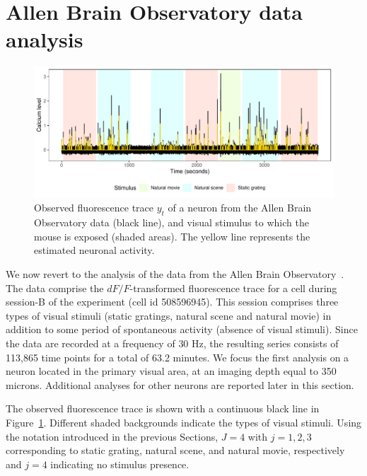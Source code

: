 \section{Allen Brain Observatory data analysis}
\label{s:dataanalysis}

\begin{figure}
	\centerline{\includegraphics[width = \linewidth]{_Images/ch3_plot_data_new.pdf}}
	\caption[Observed fluorescence trace of a neuron from the Allen Brain Observatory data and estimated neuronal activity.]{Observed fluorescence trace $y_t$ of a neuron from the Allen Brain Observatory data (black line), and visual stimulus to which the mouse is exposed (shaded areas). The yellow line represents the estimated neuronal activity.}
	\label{fig:y}
\end{figure}

We now revert to the analysis of the data from the Allen Brain Observatory~\parencite{allen}. The data comprise the $dF/F$-transformed fluorescence trace for a cell during session-B of the experiment (cell id 508596945). This session comprises three types of visual stimuli (static gratings, natural scene and natural movie) in addition to some period of spontaneous activity (absence of visual stimuli). Since the data are recorded at a frequency of $30$ Hz, the resulting series consists of 113{,}865 time points for a total of 63.2 minutes. 
We focus the first analysis on a neuron located in the primary visual area, at an imaging depth equal to 350 microns. Additional analyses for other neurons are reported later in this section.


The observed fluorescence trace is shown with a continuous black line in Figure~\ref{fig:y}. Different shaded backgrounds indicate the types of visual stimuli.
Using the notation introduced in the previous Sections, $J=4$ with $j=1, 2, 3$ corresponding to static grating, natural scene, and natural movie, respectively and $j=4$ indicating no stimulus presence. 


